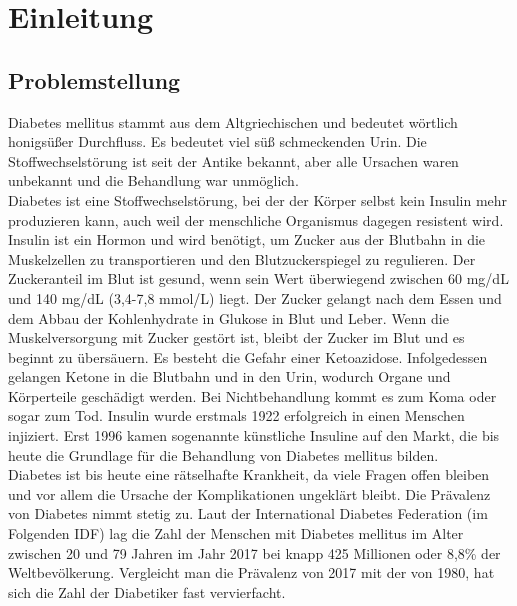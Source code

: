\section*{Einleitung}
\subsection{Problemstellung}
	Diabetes mellitus stammt aus dem Altgriechischen und bedeutet wörtlich \glqq honigsüßer Durchfluss\grqq{}. Es bedeutet \glqq viel süß schmeckenden Urin\grqq{}. Die Stoffwechselstörung ist seit der Antike bekannt, aber alle Ursachen waren unbekannt und die Behandlung war unmöglich.\cite{SG}\\
	Diabetes ist eine Stoffwechselstörung, bei der der Körper selbst kein Insulin mehr produzieren kann, auch weil der menschliche Organismus dagegen resistent wird. Insulin ist ein Hormon und wird benötigt, um Zucker aus der Blutbahn in die Muskelzellen zu transportieren und den Blutzuckerspiegel zu regulieren. Der Zuckeranteil im Blut ist gesund, wenn sein Wert überwiegend zwischen 60 mg/dL und 140 mg/dL (3,4-7,8 mmol/L) liegt. Der Zucker gelangt nach dem Essen und dem Abbau der Kohlenhydrate in Glukose in Blut und Leber. Wenn die Muskelversorgung mit Zucker gestört ist, bleibt der Zucker im Blut und es beginnt zu übersäuern. Es besteht die Gefahr einer Ketoazidose. Infolgedessen gelangen Ketone in die Blutbahn und in den Urin, wodurch Organe und Körperteile geschädigt werden. Bei Nichtbehandlung kommt es zum Koma oder sogar zum Tod. Insulin wurde erstmals 1922 erfolgreich in einen Menschen injiziert. Erst 1996 kamen sogenannte künstliche Insuline auf den Markt, die bis heute die Grundlage für die Behandlung von Diabetes mellitus bilden. \cite{SG}\\
	Diabetes ist bis heute eine rätselhafte Krankheit, da viele Fragen offen bleiben und vor allem die Ursache der Komplikationen ungeklärt bleibt. Die Prävalenz von Diabetes nimmt stetig zu. Laut der International Diabetes Federation (im Folgenden IDF) lag die Zahl der Menschen mit Diabetes mellitus im Alter zwischen 20 und 79 Jahren im Jahr 2017 bei knapp 425 Millionen oder 8,8\% der Weltbevölkerung. Vergleicht man die Prävalenz von 2017 mit der von 1980, hat sich die Zahl der Diabetiker fast vervierfacht.\cite[S. 9]{IDF}\\
